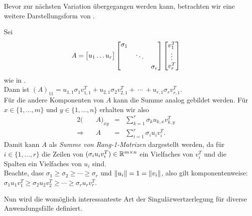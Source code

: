 Bevor zur nächsten Variation übergegangen werden kann, betrachten wir eine weitere Darstellungsform von .
\begin{remark}\label{rem:onesvd}
    Sei 
    \begin{equation*}
        A = 
        \big[
            \begin{matrix}
                u_1 \dots u_{r}
            \end{matrix}
        \big]
        \begin{bmatrix}
            \sigma_1 &  & \\
            &  \rotatebox{12}{\(\ddots\)} &  \\
            &  &  \sigma_r \\
        \end{bmatrix}
        \begin{bmatrix}
            v^{T}_1 \\
            \vdots \\
            v^{T}_r \\
        \end{bmatrix}
    \end{equation*}
    wie in .\\
    Dann ist \({(A)}_{11} = u_{1,1} \sigma_1 v^{T}_{1,1} + u_{2,1} \sigma_2 v^{T}_{2,1} +\ \cdots \ + u_{r,1} \sigma_r v^{T}_{r,1} \). \\
    Für die andere Komponenten von \(A\) kann die Summe analog gebildet werden. 
    Für \(x \in \{1,\ldots,m\}\) und \(y \in \{1,\ldots,n\}\) erhalten wir also 
    \begin{alignat*}{2}
        (&A)_{xy} &{}={}& \sum_{k=1}^{r} \sigma_k u_{k,x} v^{T}_{k,y} \\ %
        \Rightarrow \quad &A &{}={}& \sum_{i=1}^{r} \sigma_i u_i v^{T}_i. 
    \end{alignat*}
    Damit kann \(A\) als \textit{Summe von Rang-\num{1}-Matrizen} dargestellt werden, da für \(i \in \{1,\ldots,r\}\) die Zeilen von \((\sigma_i u_i v^{T}_i)\in \mathbb{R}^{m \times n}\) ein Vielfaches von \(v^{T}_i\) und die Spalten ein Vielfaches von \(u_i\) sind. \\
    Beachte, dass \(\sigma_1 \geq \sigma_2 \geq \cdots \geq \sigma_r\) und \(\lVert u_i\rVert=1=\lVert v_i\rVert\), also gilt komponentenweise: \(\sigma_1 u_1 v^{T}_1 \geq \sigma_2 u_2 v^{T}_2 \geq \cdots \geq \sigma_r u_r v^{T}_r\). 
\end{remark}
Nun wird die womöglich interessanteste Art der Singulärwertzerlegung für diverse Anwendungsfälle definiert.
